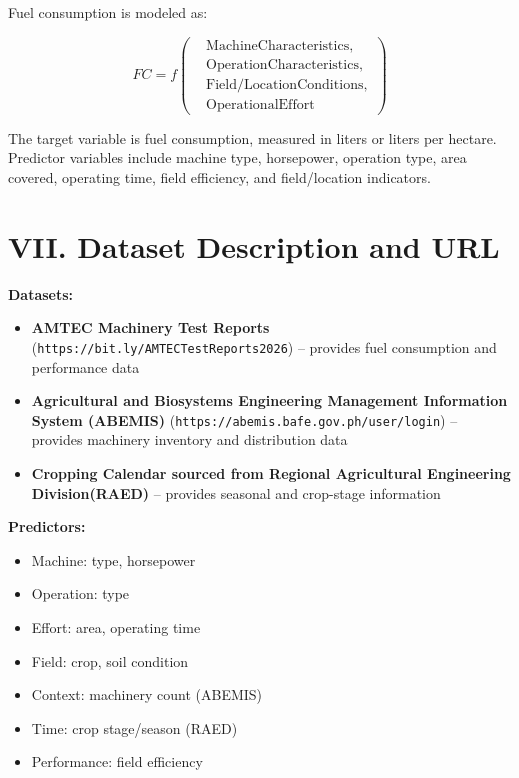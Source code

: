\documentclass[11pt,twocolumn]{article}
\begin{document}
\vspace{10pt}

Fuel consumption is modeled as:

\[
FC = f\left(
\begin{aligned}
&\mathrm{Machine Characteristics},\\
&\mathrm{Operation Characteristics},\\
&\mathrm{Field/Location Conditions},\\
&\mathrm{Operational Effort}
\end{aligned}
\right)
\]

\vspace{10pt}

The target variable is fuel consumption, measured in liters or liters per hectare. Predictor variables include machine type, horsepower, operation type, area covered, operating time, field efficiency, and field/location indicators.

\section*{VII. Dataset Description and URL}

\vspace{10pt}

\textbf{Datasets:}
\begin{itemize}
\item \textbf{\small AMTEC Machinery Test Reports} (\texttt{https://bit.ly/AMTECTestReports2026}) 
– provides fuel consumption and performance data
\item \textbf{\small Agricultural and Biosystems Engineering Management Information System (ABEMIS)} (\texttt{https://abemis.bafe.gov.ph/user/login}) 
– provides machinery inventory and distribution data
\item \textbf{\small Cropping Calendar sourced from Regional Agricultural Engineering Division(RAED)} 
– provides seasonal and crop-stage information
\end{itemize}

\vspace{10pt}

\textbf{Predictors:}
\begin{itemize}
\item Machine: type, horsepower
\item Operation: type
\item Effort: area, operating time
\item Field: crop, soil condition
\item Context: machinery count (ABEMIS)
\item Time: crop stage/season (RAED)
\item Performance: field efficiency
\end{itemize}
\end{document}
